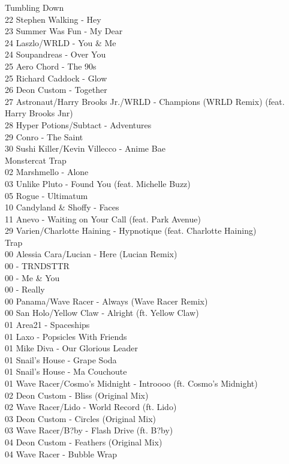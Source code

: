 \begin{multicols}{2}
Tumbling Down\\ 22 Stephen Walking - Hey\\ 23 Summer Was Fun - My Dear\\ 24 Laszlo/WRLD - You \& Me\\ 24 Soupandreas - Over You\\ 25 Aero Chord - The 90s\\ 25 Richard Caddock - Glow\\ 26 Deon Custom - Together\\ 27 Astronaut/Harry Brooks Jr./WRLD - Champions (WRLD Remix) (feat. Harry Brooks Jnr)\\ 28 Hyper Potions/Subtact - Adventures\\ 29 Conro - The Saint\\ 30 Sushi Killer/Kevin Villecco - Anime Bae\\
 \large Monstercat Trap \normalsize\\
 02 Marshmello - Alone\\ 03 Unlike Pluto - Found You (feat. Michelle Buzz)\\ 05 Rogue - Ultimatum\\ 10 Candyland \& Shoffy - Faces\\ 11 Anevo - Waiting on Your Call (feat. Park Avenue)\\ 29 Varien/Charlotte Haining - Hypnotique (feat. Charlotte Haining)\\
 \large Trap \normalsize\\
 00 Alessia Cara/Lucian - Here (Lucian Remix)\\ 00  - TRNDSTTR\\ 00  - Me \& You\\ 00  - Really\\ 00 Panama/Wave Racer - Always (Wave Racer Remix)\\ 00 San Holo/Yellow Claw - Alright (ft. Yellow Claw)\\ 01 Area21 - Spaceships\\ 01 Laxo  - Popsicles With Friends\\ 01 Mike Diva - Our Glorious Leader\\ 01 Snail's House - Grape Soda\\ 01 Snail's House - Ma Couchoute\\ 01 Wave Racer/Cosmo's Midnight - Introooo (ft. Cosmo's Midnight)\\ 02 Deon Custom - Bliss (Original Mix)\\ 02 Wave Racer/Lido - World Record (ft. Lido)\\ 03 Deon Custom - Circles (Original Mix)\\ 03 Wave Racer/B?by - Flash Drive (ft. B?by)\\ 04 Deon Custom - Feathers (Original Mix)\\ 04 Wave Racer - Bubble Wrap\\

\end{multicols}
